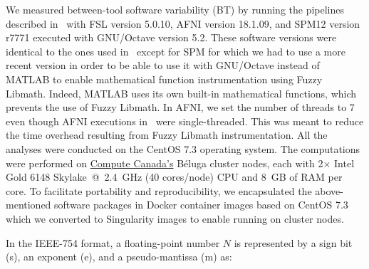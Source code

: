 \documentclass[11pt,onecolumn]{article}
\begin{document}
We measured between-tool software variability (BT) by running the pipelines
described in~\cite{bowring2019exploring} with FSL version 5.0.10, AFNI
version 18.1.09, and SPM12 version r7771 executed with GNU/Octave version
5.2. These software versions were identical to the ones used 
in~\cite{bowring2019exploring} except for SPM for which we had to use
a more recent version in order to be able to use it with GNU/Octave
instead of MATLAB to enable mathematical function instrumentation using
Fuzzy Libmath. Indeed, MATLAB uses its own built-in mathematical functions,
which prevents the use of Fuzzy Libmath. In AFNI, we set the number of
threads to 7 even though AFNI executions
in~\cite{bowring2019exploring} were single-threaded. This was meant to
reduce the time overhead resulting from Fuzzy Libmath instrumentation.
All the analyses were conducted on the CentOS 7.3 operating system. The
computations were performed on \href{https://www.computecanada.ca}{Compute
  Canada's} Béluga cluster nodes, each with 2$\times$ Intel Gold 6148 Skylake~@~2.4~GHz
(40 cores/node) CPU and 8~GB of RAM per core. To facilitate portability and reproducibility,
we encapsulated the
above-mentioned software packages in Docker container images based on CentOS 7.3
which we converted to Singularity images to enable running on cluster nodes.

In the IEEE-754 format, a floating-point number $N$ is represented by a sign
bit (s), an exponent (e), and a pseudo-mantissa (m) as:
\end{document}
